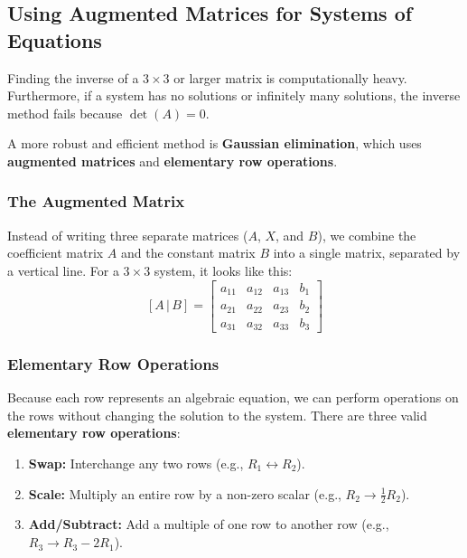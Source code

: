
\subsection{Using Augmented Matrices for Systems of Equations}

Finding the inverse of a $3 \times 3$ or larger matrix is computationally heavy. Furthermore, if a system has no solutions or infinitely many solutions, the inverse method fails because $\det(A) = 0$. 

A more robust and efficient method is \textbf{Gaussian elimination}, which uses \textbf{augmented matrices} and \textbf{elementary row operations}.

\subsubsection*{The Augmented Matrix}

Instead of writing three separate matrices ($A$, $X$, and $B$), we combine the coefficient matrix $A$ and the constant matrix $B$ into a single matrix, separated by a vertical line. For a $3 \times 3$ system, it looks like this:
\[
[A \,|\, B] = \left[ \begin{array}{ccc|c} 
a_{11} & a_{12} & a_{13} & b_1 \\ 
a_{21} & a_{22} & a_{23} & b_2 \\ 
a_{31} & a_{32} & a_{33} & b_3 
\end{array} \right]
\]

\subsubsection*{Elementary Row Operations}

Because each row represents an algebraic equation, we can perform operations on the rows without changing the solution to the system. There are three valid \textbf{elementary row operations}:
\begin{enumerate}
  \item \textbf{Swap:} Interchange any two rows (e.g., $R_1 \leftrightarrow R_2$).
  \item \textbf{Scale:} Multiply an entire row by a non-zero scalar (e.g., $R_2 \to \frac{1}{2}R_2$).
  \item \textbf{Add/Subtract:} Add a multiple of one row to another row (e.g., $R_3 \to R_3 - 2R_1$).
\end{enumerate}

